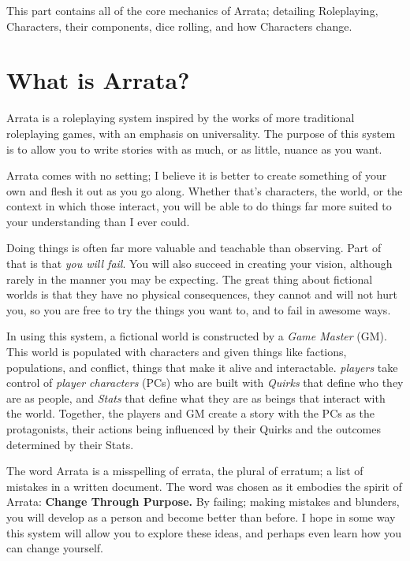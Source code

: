 \documentclass[../main.tex]{subfiles}
\begin{document}
    This part contains all of the core mechanics of Arrata; detailing Roleplaying, Characters, their components, dice rolling, and how Characters change.

    \section{What is Arrata?}

    Arrata is a roleplaying system inspired by the works of more traditional roleplaying games, with an emphasis on universality. The purpose of this system is to allow you to write stories with as much, or as little, nuance as you want.

    Arrata comes with no setting; I believe it is better to create something of your own and flesh it out as you go along. Whether that's characters, the world, or the context in which those interact, you will be able to do things far more suited to your understanding than I ever could.
    
    Doing things is often far more valuable and teachable than observing. Part of that is that {\em you will fail}. You will also succeed in creating your vision, although rarely in the manner you may be expecting. The great thing about fictional worlds is that they have no physical consequences, they cannot and will not hurt you, so you are free to try the things you want to, and to fail in awesome ways.

    In using this system, a fictional world is constructed by a {\em Game Master} (GM). This world is populated with characters and given things like factions, populations, and conflict, things that make it alive and interactable. {\em players} take control of {\em player characters} (PCs) who are built with {\em Quirks} that define who they are as people, and {\em Stats} that define what they are as beings that interact with the world. Together, the players and GM create a story with the PCs as the protagonists, their actions being influenced by their Quirks and the outcomes determined by their Stats.

    The word Arrata is a misspelling of errata, the plural of erratum; a list of mistakes in a written document. The word was chosen as it embodies the spirit of Arrata: \textbf{Change Through Purpose.} By failing; making mistakes and blunders, you will develop as a person and become better than before. I hope in some way this system will allow you to explore these ideas, and perhaps even learn how you can change yourself.
\end{document}
